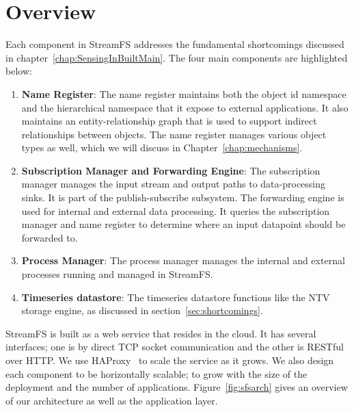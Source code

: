 \section{Overview}
Each component in StreamFS addresses the fundamental shortcomings discussed in chapter~\ref{chap:SensingInBuiltMain}.
The four main components are highlighted below:

\begin{enumerate}

\item \textbf{Name Register}: The name register maintains both the object id namespace and the hierarchical namespace
that it expose to external applications.  It also maintains an entity-relationship graph that is used to support
indirect relationships between objects.  The name register manages various object types as well, which we will discuss
in Chapter~\ref{chap:mechanisms}.

\item \textbf{Subscription Manager and Forwarding Engine}: The subscription manager manages the input stream and output
paths to data-processing sinks.  It is part of the publish-subscribe subsystem.  The forwarding engine is used for internal 
and external data processing.  It queries the
subscription manager and name register to determine where an input datapoint should be forwarded to.

\item \textbf{Process Manager}: The process manager manages the internal and external processes running and managed in StreamFS.

\item \textbf{Timeseries datastore}: The timeseries datastore functions like the NTV storage engine, as discussed in 
section~\ref{sec:shortcomings}.

\end{enumerate}

StreamFS is built as a web service that resides in the cloud.  It has several interfaces; one is by direct TCP socket communication and 
the other is RESTful~\cite{rest} over HTTP.  We use HAProxy~\cite{haproxy} to scale the service as it grows.  We also design each component
to be horizontally scalable; to grow with the size of the deployment and the number of applications.
Figure~\ref{fig:sfsarch} gives an overview of our architecture as well as the application layer.













